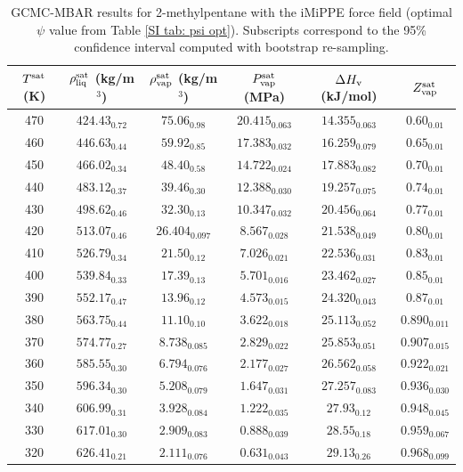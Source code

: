 \documentclass[journal=jctc,manuscript=article]{achemso}
\begin{document}
\begin{table}[htb!]
	\caption{GCMC-MBAR results for 2-methylpentane with the iMiPPE force field (optimal $\psi$ value from Table \ref{SI tab: psi opt}). Subscripts correspond to the 95\% confidence interval computed with bootstrap re-sampling.}
	\begin{center}
		\begin{tabular}{|c|c|c|c|c|c|}
			\hline
			$T^{\rm sat}$ (K) & $\rho_{\rm liq}^{\rm sat}$ (kg/m$^3$) & $\rho_{\rm vap}^{\rm sat}$ (kg/m$^3$) & $P_{\rm vap}^{\rm sat}$ (MPa) & $\Delta H_{\rm v}$ (kJ/mol) & $Z_{\rm vap}^{\rm sat}$ \\ \hline
			470 & $424.43_{0.72}$ & $75.06_{0.98}$ & $20.415_{0.063}$ & $14.355_{0.063}$ & $0.60_{0.01}$ \\
			460 & $446.63_{0.44}$ & $59.92_{0.85}$ & $17.383_{0.032}$ & $16.259_{0.079}$ & $0.65_{0.01}$ \\
			450 & $466.02_{0.34}$ & $48.40_{0.58}$ & $14.722_{0.024}$ & $17.883_{0.082}$ & $0.70_{0.01}$ \\
			440 & $483.12_{0.37}$ & $39.46_{0.30}$ & $12.388_{0.030}$ & $19.257_{0.075}$ & $0.74_{0.01}$ \\
			430 & $498.62_{0.46}$ & $32.30_{0.13}$ & $10.347_{0.032}$ & $20.456_{0.064}$ & $0.77_{0.01}$ \\
			420 & $513.07_{0.46}$ & $26.404_{0.097}$ & $8.567_{0.028}$ & $21.538_{0.049}$ & $0.80_{0.01}$ \\
			410 & $526.79_{0.34}$ & $21.50_{0.12}$ & $7.026_{0.021}$ & $22.536_{0.031}$ & $0.83_{0.01}$ \\
			400 & $539.84_{0.33}$ & $17.39_{0.13}$ & $5.701_{0.016}$ & $23.462_{0.027}$ & $0.85_{0.01}$ \\
			390 & $552.17_{0.47}$ & $13.96_{0.12}$ & $4.573_{0.015}$ & $24.320_{0.043}$ & $0.87_{0.01}$ \\
			380 & $563.75_{0.44}$ & $11.10_{0.10}$ & $3.622_{0.018}$ & $25.113_{0.052}$ & $0.890_{0.011}$ \\
			370 & $574.77_{0.27}$ & $8.738_{0.085}$ & $2.829_{0.022}$ & $25.853_{0.051}$ & $0.907_{0.015}$ \\
			360 & $585.55_{0.30}$ & $6.794_{0.076}$ & $2.177_{0.027}$ & $26.562_{0.058}$ & $0.922_{0.021}$ \\
			350 & $596.34_{0.30}$ & $5.208_{0.079}$ & $1.647_{0.031}$ & $27.257_{0.083}$ & $0.936_{0.030}$ \\
			340 & $606.99_{0.31}$ & $3.928_{0.084}$ & $1.222_{0.035}$ & $27.93_{0.12}$ & $0.948_{0.045}$ \\
			330 & $617.01_{0.30}$ & $2.909_{0.083}$ & $0.888_{0.039}$ & $28.55_{0.18}$ & $0.959_{0.067}$ \\
			320 & $626.41_{0.21}$ & $2.111_{0.076}$ & $0.631_{0.043}$ & $29.13_{0.26}$ & $0.968_{0.099}$ \\
			\hline
		\end{tabular}
	\end{center}
\end{table}
\end{document}
